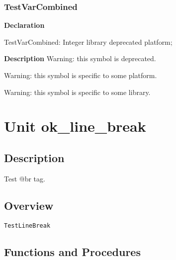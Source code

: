 \documentclass{report}
\begin{document}
\subsection*{TestVarCombined}
\begin{list}{}{
\setlength{\itemindent}{0cm}
\setlength{\listparindent}{0cm}
\setlength{\leftmargin}{\evensidemargin}
\addtolength{\leftmargin}{\tmplength}
\settowidth{\labelsep}{X}
\addtolength{\leftmargin}{\labelsep}
\setlength{\labelwidth}{\tmplength}
}
\begin{flushleft}
\item[\textbf{Declaration}\hfill]
\begin{ttfamily}
TestVarCombined: Integer library deprecated platform;\end{ttfamily}


\end{flushleft}
\par
\item[\textbf{Description}]
Warning: this symbol is deprecated.

Warning: this symbol is specific to some platform.

Warning: this symbol is specific to some library.

 

\end{list}
\chapter{Unit ok{\_}line{\_}break}
\section{Description}
Test @br tag.
\section{Overview}
\begin{description}
\item[\texttt{TestLineBreak}]
\end{description}
\section{Functions and Procedures}
\end{document}
